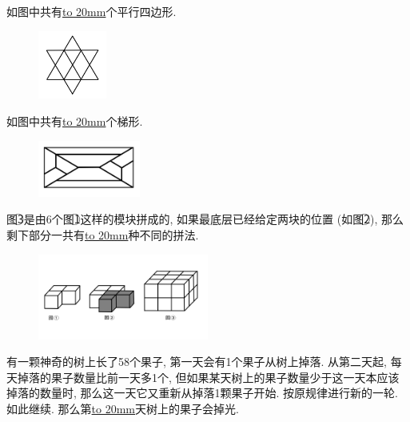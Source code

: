 \item {
    如图中共有\underline{\hbox to 20mm{}}个平行四边形.
    \begin{figure}[H] 
        \centering
        \includegraphics[width=0.2\textwidth]{./pics/Chapter_6/2017_1.png}
    \end{figure}
}

\item {
    如图中共有\underline{\hbox to 20mm{}}个梯形.
    \begin{figure}[H] 
        \centering
        \includegraphics[width=0.3\textwidth]{./pics/Chapter_6/2016_1.png}
    \end{figure}
}

\item {
    图\textcircled{3}是由6个图\textcircled{1}这样的模块拼成的, 如果最底层已经给定两块的位置 (如图\textcircled{2}), 那么剩下部分一共有\underline{\hbox to 20mm{}}种不同的拼法.
    \begin{figure}[H] 
        \centering
        \includegraphics[width=0.5\textwidth]{./pics/Chapter_6/2016_2.png}
    \end{figure}
}

\item {
    有一颗神奇的树上长了58个果子, 第一天会有1个果子从树上掉落. 从第二天起, 每天掉落的果子数量比前一天多1个, 但如果某天树上的果子数量少于这一天本应该掉落的数量时, 那么这一天它又重新从掉落1颗果子开始. 按原规律进行新的一轮. 如此继续. 那么第\underline{\hbox to 20mm{}}天树上的果子会掉光.
    \vspace{1cm}
}

